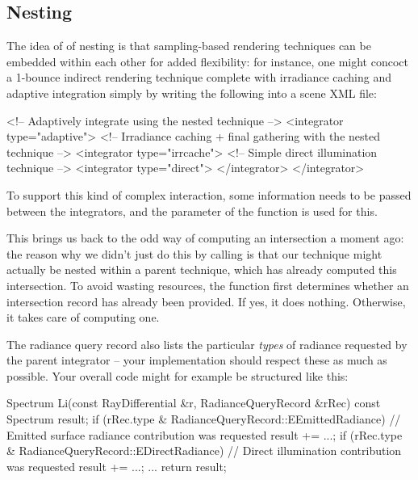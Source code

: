 \subsection{Nesting}
The idea of of nesting is that sampling-based rendering techniques can be
embedded within each other for added flexibility: for instance, one
might concoct a  1-bounce indirect rendering technique complete with
irradiance caching and adaptive integration simply by writing the following
into a scene XML file:
\begin{xml}
<!-- Adaptively integrate using the nested technique -->
<integrator type="adaptive">
    <!-- Irradiance caching + final gathering with the nested technique -->
    <integrator type="irrcache">
        <!-- Simple direct illumination technique -->
        <integrator type="direct">
    </integrator>
</integrator>
\end{xml}
To support this kind of complex interaction, some information needs to be passed between the
integrators, and the  parameter of the function
 is used for this.

This brings us back to the odd way of computing an intersection a moment ago:
the reason why we didn't just do this by calling
 is that our technique might actually be nested
within a parent technique, which has already computed this intersection.
To avoid wasting resources, the function  first
determines whether an intersection record has already been provided.
If yes, it does nothing. Otherwise, it takes care of computing one.

The radiance query record also lists the particular \emph{types} of radiance requested
by the parent integrator -- your implementation should respect these as much
as possible. Your overall code might for example be structured like this:

\begin{cpp}
   Spectrum Li(const RayDifferential &r, RadianceQueryRecord &rRec) const {
      Spectrum result;
      if (rRec.type & RadianceQueryRecord::EEmittedRadiance) {
         // Emitted surface radiance contribution was requested
         result += ...;
      }
      if (rRec.type & RadianceQueryRecord::EDirectRadiance) {
         // Direct illumination contribution was requested
         result += ...;
      }
      ...
      return result;
   }
\end{cpp}
